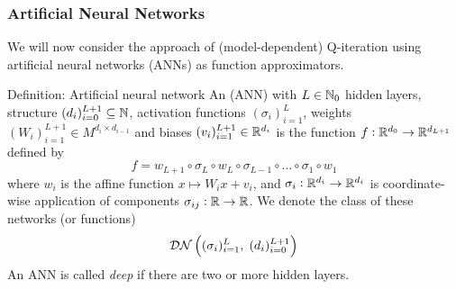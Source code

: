 \documentclass{beamer}[10]
\begin{document}
\begin{frame}
  \frametitle{Artificial Neural Networks}
  \begingroup
  \footnotesize
  We will now consider the approach of (model-dependent) Q-iteration using
  artificial neural networks (ANNs) as function approximators.
  \begin{block}{Definition: Artificial neural network}
    An  (ANN) with $L \in \mathbb{N}_0$
    hidden layers, structure
    $(d_i)_{i=0}^{L+1} \subseteq \mathbb{N}$,
    activation functions $(\sigma_i)_{i=1}^L$,
    weights $(W_i)_{i=1}^{L+1} \in M^{d_i \times d_{i-1}}$ and
    biases $(v_i)_{i=1}^{L+1} \in \mathbb{R}^{d_i}$
    is the function $f:\mathbb{R}^{d_0} \to \mathbb{R}^{d_{L+1}}$ defined by
    \[ f = w_{L+1} \circ \sigma_L \circ w_L
    \circ \sigma_{L-1} \circ \dots \circ \sigma_1 \circ w_1 \]
    where $w_i$ is the affine function $x \mapsto W_i x + v_i$,
    and $\sigma_i : \mathbb{R}^{d_i} \to \mathbb{R}^{d_i}$ is coordinate-wise
    application of components $\sigma_{ij} : \mathbb{R} \to \mathbb{R}$.
    We denote the class of these networks (or functions)
    \[ \mathcal{DN} \left( (\sigma_i)_{i=1}^L,\; (d_i)_{i=0}^{L+1} \right) \]
    An ANN is called \emph{deep} if there are two or more hidden layers.
  \end{block}
  \endgroup
\end{frame}
\end{document}
